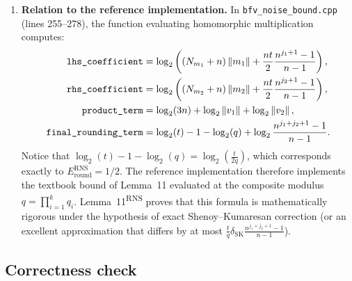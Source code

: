 \documentclass[11pt]{article}
\newcommand{\norm}[1]{\left\lVert #1\right\rVert}
\newcommand{\Sgeo}[1]{\frac{n^{#1+1}-1}{n-1}}            %
\theoremstyle{plain}
\theoremstyle{definition}
\theoremstyle{remark}
\begin{document}
\begin{enumerate}[leftmargin=2em]
      ``are small and in practice have no effect.''
\item \textbf{Relation to the reference implementation.}
      In \texttt{bfv\_noise\_bound.cpp} (lines 255--278), the function evaluating homomorphic multiplication
      computes:
      \begin{align*}
        \text{\texttt{lhs\_coefficient}} &= \log_2\left((N_{m_1}+n)\norm{m_1} + \frac{nt}{2}\Sgeo{j_1}\right),\\
        \text{\texttt{rhs\_coefficient}} &= \log_2\left((N_{m_2}+n)\norm{m_2} + \frac{nt}{2}\Sgeo{j_2}\right),\\
        \text{\texttt{product\_term}} &= \log_2(3n) + \log_2\norm{v_1} + \log_2\norm{v_2},\\
        \text{\texttt{final\_rounding\_term}} &= \log_2(t) - 1 - \log_2(q) + \log_2\Sgeo{j_1+j_2}.
      \end{align*}
      Notice that $\log_2(t) - 1 - \log_2(q) = \log_2\left(\frac{t}{2q}\right)$, which corresponds exactly to
      $E_{\mathrm{round}}^{\mathrm{RNS}} = 1/2$. The reference implementation therefore implements the textbook
      bound of Lemma~11 evaluated at the composite modulus $q = \prod_{i=1}^k q_i$. Lemma~11\textsuperscript{RNS}
      proves that this formula is mathematically rigorous under the hypothesis of exact Shenoy--Kumaresan
      correction (or an excellent approximation that differs by at most $\frac{t}{q}\delta_{\mathrm{SK}}\Sgeo{j_1+j_2}$).
\end{enumerate}

\subsection{Correctness check}
\end{document}
